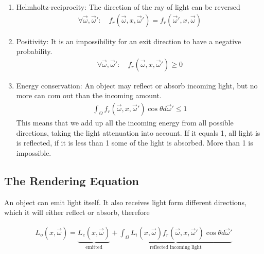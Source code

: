 \documentclass[10pt]{armath}
\numberwithin{equation}{section}
\newenvironment{Figure}
{\par\medskip\noindent\minipage{\linewidth}}
{\endminipage\par\medskip}
\theoremstyle{definition}
\begin{document}
\begin{multicols}{2}
  \begin{enumerate}
    \item Helmholtz-reciprocity: The direction of the ray of light can be
      reversed
      \begin{align*}
        \forall\vec{\omega},\vec{\omega}':\quad
        f_r\left(\vec{\omega},x,\vec{\omega}'\right)=f_r\left(\vec{\omega}',x,\vec{\omega}\right)
      \end{align*}
    \item Positivity: It is an impossibility for an exit direction to have a
      negative probability.
      \begin{align*}
        \forall\vec{\omega},\vec{\omega}':\quad
        f_r\left(\vec{\omega},x,\vec{\omega}'\right)\geq 0
      \end{align*}
    \item Energy conservation: An object may reflect or absorb incoming light,
      but no more can com out than the incoming amount.
      \begin{align*}
        \int_\Omega
        f_r\left(\vec{\omega},x,\vec{\omega}'\right)\cos\theta d\vec{\omega}'\leq
        1
      \end{align*}
      This means that we add up all the incoming energy from all possible
      directions, taking the light attenuation into account. If it equals 1, all
      light is is reflected, if it is less than 1 some of the light is absorbed.
      More than 1 is impossible.
  \end{enumerate}

  \subsection{The Rendering Equation}%
  \label{sub:the_rendering_equation}

  An object can emit light itself. It also receives light form different
  directions, which it will either reflect or absorb, therefore

  \begin{Figure}
    \begin{center}
      
    \end{center}
    \label{fig:03_3}
  \end{Figure}

  \begin{align*}
    L_o\left(x,\vec{\omega}\right)=\underbrace{L_e\left(x,\vec{\omega}\right)}_\text{emitted}+\underbrace{\int_\Omega
      L_i\left(x,\vec{\omega}\right)f_r\left(\vec{\omega},x,\vec{\omega}'\right)\cos\theta
      d\vec{\omega}'}_\text{reflected incoming light}
  \end{align*}


\end{multicols}
\end{document}
